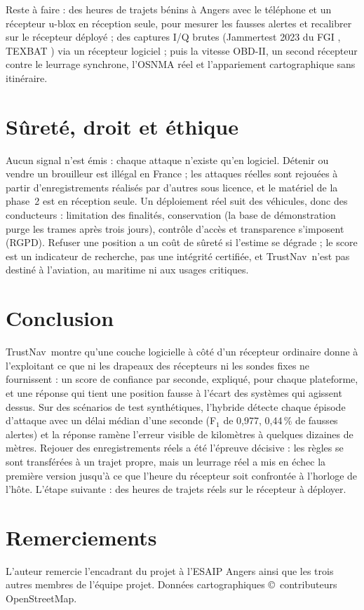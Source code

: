 \documentclass[conference]{IEEEtran}
\newcommand{\sys}{TrustNav}
\begin{document}
Reste à faire : des heures de trajets bénins à Angers avec le téléphone et un récepteur u-blox en réception seule, pour mesurer les fausses alertes et recalibrer sur le récepteur déployé ; des captures I/Q brutes (Jammertest 2023 du FGI \cite{fgi2023}, TEXBAT \cite{texbat}) via un récepteur logiciel ; puis la vitesse OBD-II, un second récepteur contre le leurrage synchrone, l'OSNMA réel et l'appariement cartographique sans itinéraire.

\section{Sûreté, droit et éthique}\label{sec:ethics}
Aucun signal n'est émis : chaque attaque n'existe qu'en logiciel. Détenir ou vendre un brouilleur est illégal en France \cite{anfr2024} ; les attaques réelles sont rejouées à partir d'enregistrements réalisés par d'autres sous licence, et le matériel de la phase~2 est en réception seule. Un déploiement réel suit des véhicules, donc des conducteurs : limitation des finalités, conservation (la base de démonstration purge les trames après trois jours), contrôle d'accès et transparence s'imposent (RGPD). Refuser une position a un coût de sûreté si l'estime se dégrade ; le score est un indicateur de recherche, pas une intégrité certifiée, et \sys\ n'est pas destiné à l'aviation, au maritime ni aux usages critiques.

\section{Conclusion}
\sys\ montre qu'une couche logicielle à côté d'un récepteur ordinaire donne à l'exploitant ce que ni les drapeaux des récepteurs ni les sondes fixes ne fournissent : un score de confiance par seconde, expliqué, pour chaque plateforme, et une réponse qui tient une position fausse à l'écart des systèmes qui agissent dessus. Sur des scénarios de test synthétiques, l'hybride détecte chaque épisode d'attaque avec un délai médian d'une seconde (F$_1$ de 0,977, 0,44\,\% de fausses alertes) et la réponse ramène l'erreur visible de kilomètres à quelques dizaines de mètres. Rejouer des enregistrements réels a été l'épreuve décisive : les règles se sont transférées à un trajet propre, mais un leurrage réel a mis en échec la première version jusqu'à ce que l'heure du récepteur soit confrontée à l'horloge de l'hôte. L'étape suivante : des heures de trajets réels sur le récepteur à déployer.

\balance
\section*{Remerciements}
L'auteur remercie l'encadrant du projet à l'ESAIP Angers ainsi que les trois autres membres de l'équipe projet. Données cartographiques \copyright\ contributeurs OpenStreetMap.
\end{document}
